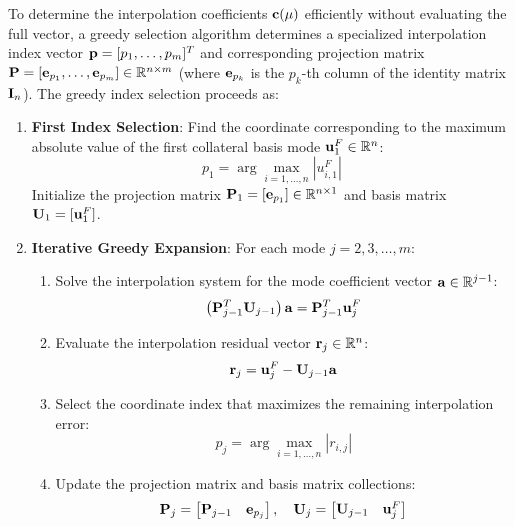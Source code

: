 To determine the interpolation coefficients $\mathbf{c}(\mathbf{\mu})$ efficiently without evaluating the full vector, a greedy selection algorithm determines a specialized interpolation index vector $\mathbf{p} = [p_1, \dots, p_m]^T$ and corresponding projection matrix $\mathbf{P} = [\mathbf{e}_{p_1}, \dots, \mathbf{e}_{p_m}] \in \mathbb{R}^{n \times m}$ (where $\mathbf{e}_{p_k}$ is the $p_k$-th column of the identity matrix $\mathbf{I}_n$). The greedy index selection proceeds as:
\begin{enumerate}
        \item \textbf{First Index Selection}: Find the coordinate corresponding to the maximum absolute value of the first collateral basis mode $\mathbf{u}_1^F \in \mathbb{R}^n$:
        \begin{equation}
                p_1 = \arg\max_{i=1,\dots,n} |u_{i, 1}^F|
        \end{equation}
        Initialize the projection matrix $\mathbf{P}_1 = [\mathbf{e}_{p_1}] \in \mathbb{R}^{n \times 1}$ and basis matrix $\mathbf{U}_1 = [\mathbf{u}_1^F]$.
        \item \textbf{Iterative Greedy Expansion}: For each mode $j = 2, 3, \dots, m$:
        \begin{enumerate}
                \item Solve the interpolation system for the mode coefficient vector $\mathbf{a} \in \mathbb{R}^{j-1}$:
                \begin{equation}
                        \left( \mathbf{P}_{j-1}^T \mathbf{U}_{j-1} \right) \mathbf{a} = \mathbf{P}_{j-1}^T \mathbf{u}_j^F
                \end{equation}
                \item Evaluate the interpolation residual vector $\mathbf{r}_j \in \mathbb{R}^n$:
                \begin{equation}
                        \mathbf{r}_j = \mathbf{u}_j^F - \mathbf{U}_{j-1} \mathbf{a}
                \end{equation}
                \item Select the coordinate index that maximizes the remaining interpolation error:
                \begin{equation}
                        p_j = \arg\max_{i=1,\dots,n} |r_{i, j}|
                \end{equation}
                \item Update the projection matrix and basis matrix collections:
                \begin{equation}
                        \mathbf{P}_j = \begin{bmatrix} \mathbf{P}_{j-1} & \mathbf{e}_{p_j} \end{bmatrix}, \quad \mathbf{U}_j = \begin{bmatrix} \mathbf{U}_{j-1} & \mathbf{u}_j^F \end{bmatrix}
                \end{equation}
        \end{enumerate}
\end{enumerate}
